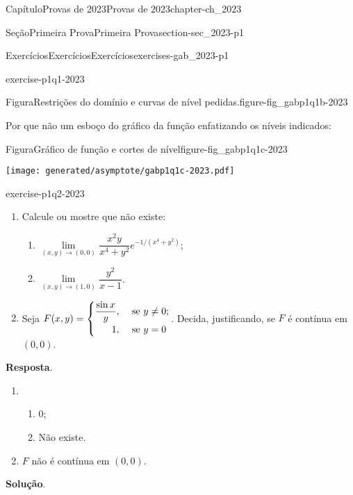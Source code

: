\documentclass[oneside,10pt,]{book}
\newcommand{\blocktitlefont}{\relax}
\numberwithin{equation}{section}
\begin{document}
\begin{chapterptx}{Capítulo}{Provas de 2023}{}{Provas de 2023}{}{}{chapter-ch_2023}
\begin{sectionptx}{Seção}{Primeira Prova}{}{Primeira Prova}{}{}{section-sec_2023-p1}
\begin{exercises-subsection-numberless}{Exercícios}{Exercícios}{}{Exercícios}{}{}{exercises-gab_2023-p1}
\begin{divisionexercise}{1}{}{}{exercise-p1q1-2023}
\begin{figureptx}{Figura}{Restrições do domínio e curvas de nível pedidas.}{figure-fig_gabp1q1b-2023}{}
\begin{image}{0.25}{0.5}{0.25}{}
{\begin{tikzpicture}[scale=1]
\end{tikzpicture}
}%
\end{image}%
\tcblower
\end{figureptx}%
%
 \par
Por que não um esboço do gráfico da função enfatizando os níveis indicados: \begin{figureptx}{Figura}{Gráfico de função e cortes de nível}{figure-fig_gabp1q1c-2023}{}%
\begin{image}{0.25}{0.5}{0.25}{}%
\texttt{[image: generated/asymptote/gabp1q1c-2023.pdf]}
\end{image}%
\tcblower
\end{figureptx}%
%
%
\end{divisionexercise}%
\begin{divisionexercise}{2}{}{}{exercise-p1q2-2023}%
%
\begin{enumerate}[label=\alph*]
\item{}Calcule ou mostre que não existe:%
\begin{enumerate}[label=\roman*]
\item{}\(\lim\limits_{(x,y)\to
(0,0)}\dfrac{x^2y}{x^4+y^2}e^{-1/(x^4+y^2)}\);%
\item{}\(\lim\limits_{(x,y)\to (1,0)}\dfrac{y^2}{x-1}\).%
\end{enumerate}
%
\item{}Seja \(F(x,y)=
\begin{cases}
\dfrac{\sin x}{y},& \text{ se }y\neq0;\\
\hfill 1,& \text{ se }y=0
\end{cases}\). Decida, justificando, se \(F\) é contínua em \((0,0)\).%
\end{enumerate}
%
\par\smallskip%
\noindent\textbf{\blocktitlefont Resposta}.\hypertarget{answer-p1q2-2023-b}{}\quad{}%
\begin{enumerate}[label=\alph*]
\item{}%
\begin{enumerate}[label=\roman*]
\item{}\(0\);%
\item{}Não existe.%
\end{enumerate}
%
\item{}\(F\) não é contínua em \((0,0)\).%
\end{enumerate}
%
\par\smallskip%
\noindent\textbf{\blocktitlefont Solução}.\hypertarget{solution-p1q2-2023-c}{}\quad{}%
\begin{enumerate}[label=\alph*]

\end{enumerate}
\end{divisionexercise}
\end{exercises-subsection-numberless}
\end{sectionptx}
\end{chapterptx}
\end{document}
